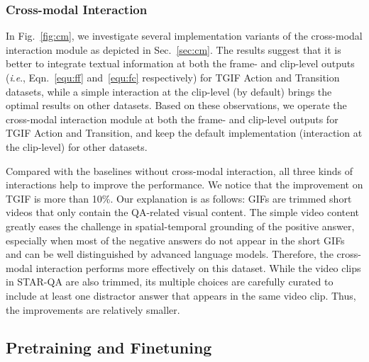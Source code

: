 \documentclass[10pt,journal,compsoc]{IEEEtran}
\newcommand{\ie}{\textit{i}.\textit{e}.}
\begin{document}
\subsubsection{Cross-modal Interaction}
In Fig.~\ref{fig:cm}, we investigate several implementation variants of the cross-modal interaction module as depicted in Sec.~\ref{sec:cm}. The results suggest that it is better to integrate textual information at both the frame- and clip-level outputs (\ie, Eqn.~\eqref{equ:ff} and~\eqref{equ:fc} respectively) for TGIF Action and Transition datasets, while a simple interaction at the clip-level (by default) brings the optimal results on other datasets. 
Based on these observations, we operate the cross-modal interaction module at both the frame- and clip-level outputs for TGIF Action and Transition, and keep the default implementation (interaction at the clip-level) for other datasets.


Compared with the baselines without cross-modal interaction, all three kinds of interactions help to improve the performance. 
We notice that the improvement on TGIF is more than 10\%. Our explanation is as follows: GIFs are trimmed short videos that only contain the QA-related visual content. The simple video content greatly eases the challenge in spatial-temporal grounding of the positive answer, especially when most of the negative answers do not appear in the short GIFs and can be well distinguished by advanced language models. Therefore, the cross-modal interaction performs more effectively on this dataset. While the video clips in STAR-QA are also trimmed, its multiple choices are carefully curated to include at least one distractor answer that appears in the same video clip. Thus, the improvements are relatively smaller.

\subsection{Pretraining and Finetuning}
\label{sec:pf}
\end{document}
